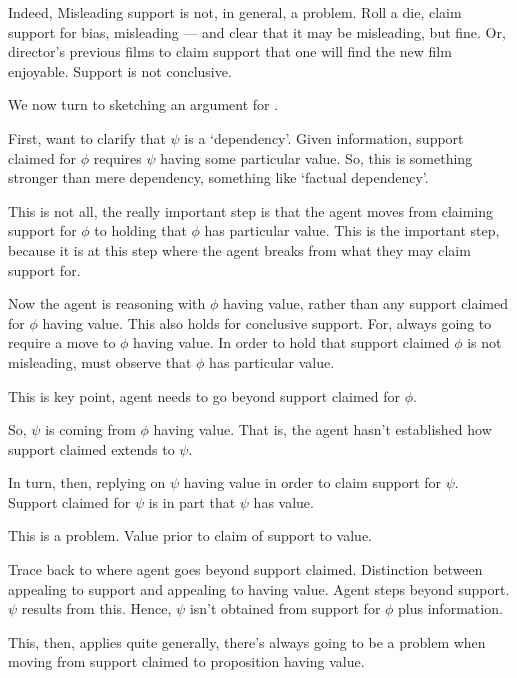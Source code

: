 \begin{note}
  Indeed, Misleading support is not, in general, a problem.
  Roll a die, claim support for bias, misleading --- and clear that it may be misleading, but fine.
  Or, director's previous films to claim support that one will find the new film enjoyable.
  Support is not conclusive.
\end{note}

\begin{note}[Explanation of \nI{}]
  We now turn to sketching an argument for \nI{}.

  First, want to clarify that \(\psi\) is a `dependency'.
  Given information, support claimed for \(\phi\) requires \(\psi\) having some particular value.
  So, this is something stronger than mere dependency, something like `factual dependency'.

  This is not all, the really important step is that the agent moves from claiming support for \(\phi\) to holding that \(\phi\) has particular value.
  This is the important step, because it is at this step where the agent breaks from what they may claim support for.

  Now the agent is reasoning with \(\phi\) having value, rather than any support claimed for \(\phi\) having value.
  This also holds for conclusive support.
  For, always going to require a move to \(\phi\) having value.
  In order to hold that support claimed \(\phi\) is not misleading, must observe that \(\phi\) has particular value.

  This is key point, agent needs to go beyond support claimed for \(\phi\).

  So, \(\psi\) is coming from \(\phi\) having value.
  That is, the agent hasn't established how support claimed extends to \(\psi\).

  In turn, then, replying on \(\psi\) having value in order to claim support for \(\psi\).
  Support claimed for \(\psi\) is in part that \(\psi\) has value.

  This is a problem.
  Value prior to claim of support to value.

  Trace back to where agent goes beyond support claimed.
  Distinction between appealing to support and appealing to having value.
  Agent steps beyond support.
  \(\psi\) results from this.
  Hence, \(\psi\) isn't obtained from support for \(\phi\) plus information.

  This, then, applies quite generally, there's always going to be a problem when moving from support claimed to proposition having value.


\end{note}
